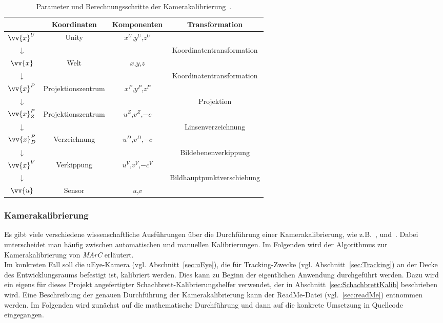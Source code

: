 \begin{table}
	\centering
	\renewcommand{\arraystretch}{1.4}
	\begin{tabular}{|c|c|c|c|}
		\hline
		\Absatzbox{}
		& \textbf{Koordinaten} & \textbf{Komponenten}&\textbf{Transformation}\\
		\hline
		$\vv{x}^U$ & Unity &$x^U$,$y^U$,$z^U$& \\
		\cline{2-4}
		$\downarrow$ & & & Koordinatentransformation\\
		\cline{2-4}
		$\vv{x}$ & Welt &$x$,$y$,$z$&  \\
		\cline{2-4}
		$\downarrow$ & & & Koordinatentransformation\\
		\cline{2-4}
		$\vv{x}^P$ & Projektionszentrum &$x^P$,$y^P$,$z^P$& \\
		\cline{2-4}
		$\downarrow$ & & & Projektion \\
		\cline{2-4}
		$\vv{x}^P_Z$ & Projektionszentrum &$u^Z$,$v^Z$,$-c$& \\
		\cline{2-4}
		$\downarrow$ & & & Linsenverzeichnung\\
		\cline{2-4}	
		$\vv{x}^P_D$ & Verzeichnung &$u^D$,$v^D$,$-c$& \\
		\cline{2-4}
		$\downarrow$ & & & Bildebenenverkippung\\
		\cline{2-4}		
		$\vv{x}^V$ &Verkippung &$u^V$,$v^V$,$-c^V$& \\
		\cline{2-4}
		$\downarrow$ & & & Bildhauptpunktverschiebung\\
		\cline{2-4}	
		$\vv{u}$ & Sensor &$u$,$v$ & \\
		\hline
	\end{tabular}
	\caption[Parameter und Berechnungsschritte der Kamerakalibrierung]{Parameter und Berechnungsschritte der Kamerakalibrierung~\cite{Meisel:77890}.}
	\label{tab:camCalibParam}
\end{table}

\subsubsection{Kamerakalibrierung}\label{sec:camCalib}
Es gibt viele verschiedene wissenschaftliche Ausführungen über die Durchführung einer Kamerakalibrierung, wie z.B.~\cite{5982395}, \cite{888718} und~\cite{faugeras1993three}. Dabei unterscheidet man häufig zwischen automatischen und manuellen Kalibrierungen. Im Folgenden wird der Algorithmus zur Kamerakalibrierung von \textit{MArC} erläutert.\\
Im konkreten Fall soll die uEye-Kamera (vgl. Abschnitt~\ref{sec:uEye}), die für Tracking-Zwecke (vgl. Abschnitt~\ref{sec:Tracking}) an der Decke des Entwicklungsraums befestigt ist, kalibriert werden. Dies kann zu Beginn der eigentlichen Anwendung durchgeführt werden. Dazu wird ein eigens für dieses Projekt angefertigter Schachbrett-Kalibrierungshelfer verwendet, der in Abschnitt~\ref{sec:SchachbrettKalib} beschrieben wird. Eine Beschreibung der genauen Durchführung der Kamerakalibrierung kann der ReadMe-Datei (vgl.~\ref{sec:readMe}) entnommen werden. Im Folgenden wird zunächst auf die mathematische Durchführung und dann auf die konkrete Umsetzung in Quellcode eingegangen.

